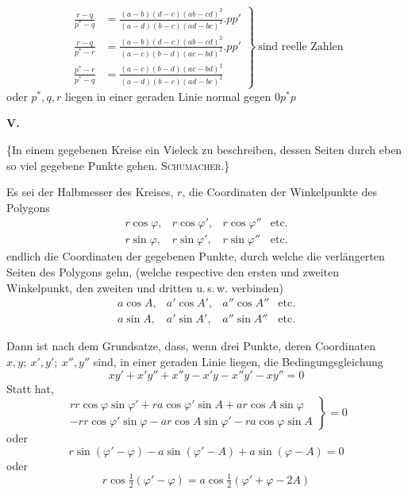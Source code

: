 %
\[
\left.\begin{aligned}
\frac{r-q}{p^*-q}&=\frac{(a-b)(d-c)(ab-cd)^2}{(a-d)(b-c)(ad-bc)^2}.pp'\\
\frac{r-q}{p^*-r}&=\frac{(a-b)(d-c)(ab-cd)^2}{(a-c)(b-d)(ac-bd)^2}.pp'\\
\frac{p^*-r}{p^*-q}&=\frac{(a-c)(b-d)(ac-bd)^2}{(a-d)(b-c)(ad-bc)^2}
\end{aligned}\right\}\ \text{sind reelle Zahlen}
\]
oder \(p^*,q,r\) liegen in einer geraden Linie normal gegen \(0p^*p\)
\par\medskip{}
\centerline{\textbf{V.}}\nobreak\smallskip
\{In einem gegebenen Kreise ein Vieleck zu beschreiben, dessen Seiten durch eben so viel gegebene Punkte gehen. \textsc{Schumacher}.\}

Es sei der Halbmesser des Kreises, \(r\), die Coordinaten der Winkelpunkte des Polygons
\[
\begin{array}{llll}
r\cos\varphi,&r\cos\varphi',&r\cos\varphi''&\text{etc.}\\
r\sin\varphi,&r\sin\varphi',&r\sin\varphi''&\text{etc.}
\end{array}
\]
endlich die Coordinaten der gegebenen Punkte, durch welche die verlängerten Seiten des Polygons gehn, (welche respective den ersten und zweiten Winkelpunkt, den zweiten und dritten u.\,s.\,w. verbinden)
\[
\begin{array}{llll}
a\cos A,&a'\cos A',&a''\cos A''&\text{etc.}\\
a\sin A,&a'\sin A',&a''\sin A''&\text{etc.}
\end{array}
\]
\par
Dann ist nach dem Grundsatze, dass, wenn drei Punkte, deren Coordinaten \(x,y;\ x',y';\ x'',y''\) sind, in einer geraden Linie liegen, die Bedingungsgleichung
\[
xy'+x'y''+x''y-x'y-x''y'-xy''=0
\]
Statt hat,
\[
\left.\begin{aligned}
rr\cos\varphi\sin\varphi'+ra\cos\varphi'\sin A+ar\cos A\sin\varphi\\
-rr\cos\varphi'\sin\varphi-ar\cos A\sin\varphi'-ra\cos\varphi\sin A
\end{aligned}\right\}=0
\]
oder
\[
r\sin(\varphi'-\varphi)-a\sin(\varphi'-A)+a\sin(\varphi-A)=0
\]
oder
\[
r\cos\tfrac12(\varphi'-\varphi)=a\cos\tfrac12(\varphi'+\varphi-2A)
\]
